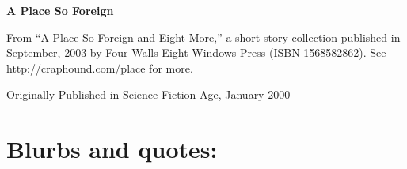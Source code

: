 

\newenvironment{authorof}{\begin{flushright}\sffamily}{\end{flushright}}


\begin{center}
\textbf{\huge\textsf{{A Place So Foreign}}}
\end{center}


From ``A Place So Foreign and Eight More,'' a short story
collection published in September, 2003 by Four Walls Eight Windows
Press (ISBN 1568582862). See http://craphound.com/place for more.

Originally Published in Science Fiction Age, January 2000


\section{Blurbs and quotes:}

